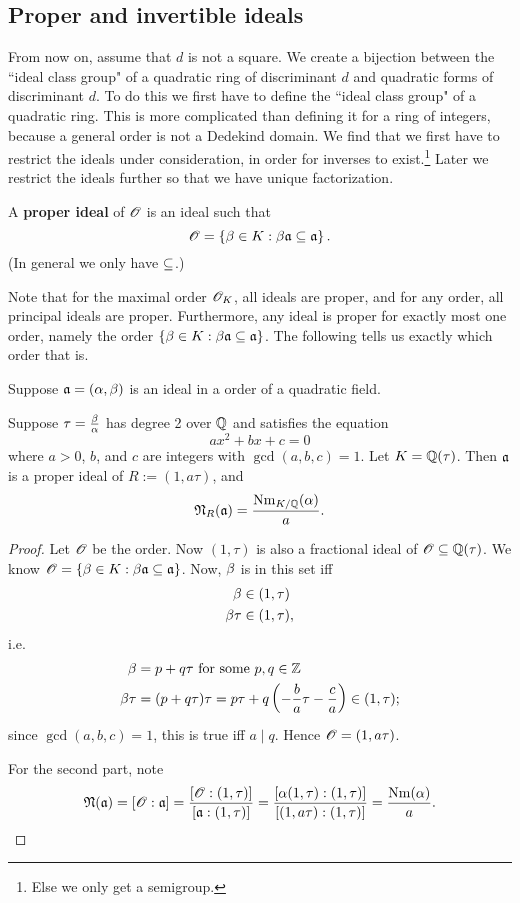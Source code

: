 \subsection{Proper and invertible ideals}
From now on, assume that $d$ is not a square. We create a bijection between the ``ideal class group" of a quadratic ring of discriminant $d$ and quadratic forms of discriminant $d$. To do this we first have to define the ``ideal class group" of a quadratic ring. This is more complicated than defining it for a ring of integers, because a general order is not a Dedekind domain. We find that we first have to restrict the ideals under consideration, in order for inverses to exist.{\footnote{Else we only get a semigroup.}} Later we restrict the ideals further so that we have unique factorization.
\begin{df}
A \textbf{proper ideal} of $\mathscr{O}$ is an ideal such that
\[
\mathscr{O}=\left\{{\beta\in K}:{\beta\mathfrak{a}\subseteq\mathfrak{a}}\right\}.
\]
(In general we only have $\subseteq$.)
\end{df}
Note that for the maximal order $\mathscr{O}_K$, all ideals are proper, and for any order, all principal ideals are proper. Furthermore, any ideal is proper for exactly most one order, namely the order $\left\{{\beta\in K}:{\beta\mathfrak{a}\subseteq\mathfrak{a}}\right\}$. The following tells us exactly which order that is.
\begin{lem}
Suppose $\mathfrak{a}=(\alpha, \beta)$ is an ideal in a order of a quadratic field.

Suppose $\tau=\frac{\beta}{\alpha}$ has degree 2 over $\mathbb{Q}$ and satisfies the equation
\[
ax^2+bx+c=0
\]
where $a>0$, $b$, and $c$ are integers with $\gcd(a,b,c)=1$. Let $K=\mathbb{Q}(\tau)$. Then $\mathfrak{a}$ is a proper ideal of $R:=(1,a\tau)$, and 
\[
\mathfrak N_R(\mathfrak{a})=\frac{\operatorname{Nm}_{K/\mathbb{Q}}(\alpha)}{a}.
\]
\end{lem}
\begin{proof}
Let $\mathscr{O}$ be the order. 
Now $(1,\tau)$ is also a fractional ideal of $\mathscr{O}\subseteq \mathbb{Q}(\tau)$. 
We know $\mathscr{O}=\left\{{\beta\in K}:{\beta\mathfrak{a}\subseteq\mathfrak{a}}\right\}$. Now, $\beta$ is in this set iff
\begin{align*}
\beta&\in (1,\tau)\\
\beta\tau &\in (1,\tau),
\end{align*}
i.e.
\begin{align*}
\beta&=p+q\tau\text{ for some }p,q\in \mathbb{Z}\\
\beta\tau &=(p+q\tau)\tau=p\tau +q\left( {-\frac ba\tau-\frac ca} \right)\in (1,\tau);
\end{align*}
since $\gcd(a,b,c)=1$, this is true iff $a\mid q$. Hence $\mathscr{O}=(1,a\tau)$.

For the second part, note
\[
\mathfrak{N}(\mathfrak{a})=[\mathscr{O}:\mathfrak{a}]=
\frac{[\mathscr{O}:(1,\tau)]}{[\mathfrak{a}:(1,\tau)]}=
\frac{[\alpha(1,\tau):(1,\tau)]}{[(1,a\tau):(1,\tau)]}=\frac{\operatorname{Nm}(\alpha)}{a}.
\]
\end{proof}
